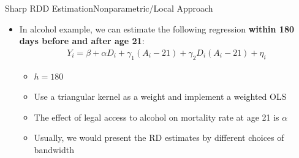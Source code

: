 \documentclass[dvipsnames,hyperref={pdfpagelabels=false}]{beamer}
\begin{document}
%		




\begin{frame}{Sharp RDD Estimation}{Nonparametric/Local Approach}
	\begin{itemize}
		
		
		\item In alcohol example, we can estimate the following regression \textbf{within 180 days before and after age 21}:
		\begin{multline*}
		Y_i=\beta+\alpha D_{i}+\gamma_{1}(A_{i}-21) +\gamma_{2}D_{i}(A_{i}-21)+\eta_i 
		\end{multline*}
	\begin{itemize}		
		\item $h=180$
		\vspace{0.2cm}	
		\item Use a triangular kernel as a weight and implement a weighted OLS
		\vspace{0.2cm}
		\item The effect of legal access to alcohol on mortality rate at age 21 is $\alpha$
		\vspace{0.2cm}
		\item Usually, we would present the RD estimates by different choices of bandwidth
		\vspace{0.2cm}	
			\end{itemize}
	\end{itemize}
\end{frame}
\end{document}

